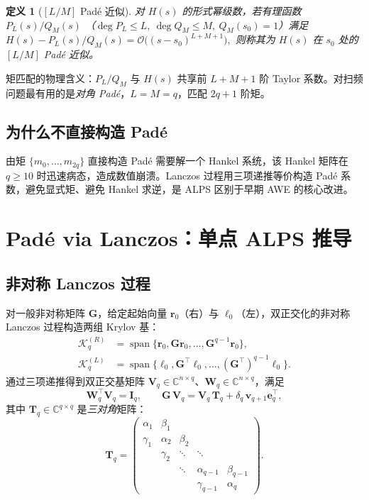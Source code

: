 \documentclass[11pt,a4paper]{ctexart}
\newcommand{\C}{\mathbb{C}}
\DeclareMathOperator{\spanop}{span}
\newtheorem{definition}{定义}
\begin{document}
\begin{definition}[{$[L/M]$ Padé 近似}]
对 $H(s)$ 的形式幂级数，若有理函数
\(
  P_L(s)/Q_M(s)
\)
（$\deg P_L\le L,\ \deg Q_M\le M,\ Q_M(s_0)=1$）满足
\(
  H(s) - P_L(s)/Q_M(s) = \mathcal O\big((s-s_0)^{L+M+1}\big),
\)
则称其为 $H(s)$ 在 $s_0$ 处的 $[L/M]$ Padé 近似。
\end{definition}

矩匹配的物理含义：$P_L/Q_M$ 与 $H(s)$ 共享前 $L+M+1$ 阶 Taylor 系数。对扫频问题最有用的是\emph{对角 Padé}，$L=M=q$，匹配 $2q+1$ 阶矩。

\subsection{为什么不直接构造 Padé}

由矩 $\{m_0,\dots,m_{2q}\}$ 直接构造 Padé 需要解一个 Hankel 系统，该 Hankel 矩阵在 $q\ge 10$ 时迅速病态，造成数值崩溃。Lanczos 过程用三项递推等价构造 Padé 系数，避免显式矩、避免 Hankel 求逆，是 ALPS 区别于早期 AWE \cite{Pillage1990} 的核心改进。

\section{Padé via Lanczos：单点 ALPS 推导}

\subsection{非对称 Lanczos 过程}

对一般非对称矩阵 $\bm G$，给定起始向量 $\bm r_0$（右）与 $\bm \ell_0$（左），双正交化的非对称 Lanczos 过程构造两组 Krylov 基：
\begin{align}
  \mathcal K_q^{(R)} &= \spanop\{\bm r_0,\bm G\bm r_0,\dots,\bm G^{q-1}\bm r_0\},\\
  \mathcal K_q^{(L)} &= \spanop\{\bm \ell_0,\bm G^{\!\top}\bm \ell_0,\dots,(\bm G^{\!\top})^{q-1}\bm \ell_0\}.
\end{align}
通过三项递推得到双正交基矩阵 $\bm V_q\in\C^{n\times q}$、$\bm W_q\in\C^{n\times q}$，满足
\begin{equation}
  \bm W_q^{\!\top}\bm V_q = \bm I_q,\qquad
  \bm G\,\bm V_q = \bm V_q\,\bm T_q + \delta_q\,\bm v_{q+1}\bm e_q^{\!\top},
\end{equation}
其中 $\bm T_q\in\C^{q\times q}$ 是\emph{三对角}矩阵：
\begin{equation}
  \bm T_q = \begin{pmatrix}
  \alpha_1 & \beta_1 \\
  \gamma_1 & \alpha_2 & \beta_2 \\
   & \gamma_2 & \ddots & \ddots \\
   & & \ddots & \alpha_{q-1} & \beta_{q-1}\\
   & & & \gamma_{q-1} & \alpha_q
  \end{pmatrix}.
  \label{eq:tridiag}
\end{equation}
\end{document}

